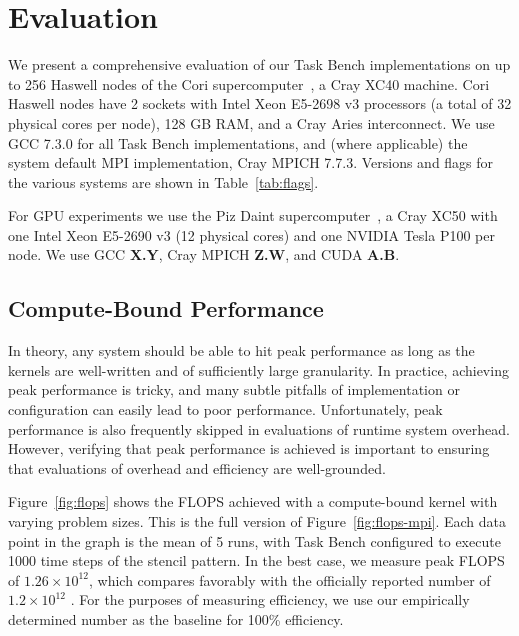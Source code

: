 \section{Evaluation}
\label{sec:evaluation}



We present a comprehensive evaluation of our Task Bench implementations on up to 256
Haswell nodes of the Cori supercomputer~\cite{Cori}, a Cray XC40
machine. Cori Haswell nodes have 2 sockets with Intel Xeon E5-2698 v3
processors (a total of 32 physical cores per node), 128 GB RAM, and a
Cray Aries interconnect. We use GCC 7.3.0 for all Task Bench
implementations, and (where applicable) the system default MPI
implementation, Cray MPICH 7.7.3. Versions and flags for the
various systems are shown in Table~\ref{tab:flags}.

For GPU experiments we use the Piz Daint supercomputer~\cite{PizDaint}, a Cray XC50 with
one Intel Xeon E5-2690 v3 (12 physical cores) and one NVIDIA Tesla
P100 per node. We use GCC \textbf{X.Y}, Cray MPICH \textbf{Z.W}, and
CUDA \textbf{A.B}.


\subsection{Compute-Bound Performance}
\label{subsec:peak-performance-and-efficiency}

In theory, any system should be able to hit peak performance as long as
the kernels are well-written and of sufficiently large granularity. In
practice, achieving peak performance is tricky, and many subtle pitfalls of implementation or configuration can easily lead to poor performance. Unfortunately, peak performance is also frequently skipped in evaluations of
runtime system overhead. However, verifying that peak performance is
achieved is important to ensuring that evaluations of overhead and
efficiency are well-grounded.






Figure~\ref{fig:flops} shows the FLOPS achieved with a compute-bound
kernel with varying problem sizes. This is the full version of
Figure~\ref{fig:flops-mpi}. Each data point in the graph is the mean of 5 runs, with Task Bench configured to execute 1000 time steps of the stencil pattern. In the best case, we measure peak FLOPS of
$1.26 \times 10^{12}$, which compares favorably with the officially
reported number of $1.2 \times 10^{12}$ \cite{Cori}. For the purposes
of measuring efficiency, we use our empirically determined number as
the baseline for 100\% efficiency.

